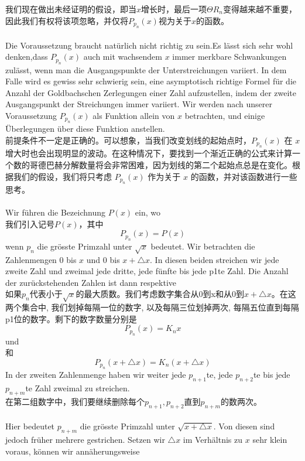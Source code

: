 \documentclass[UTF8,a4paper,zihao=-4]{article}
\begin{document}
\indent 我们现在做出未经证明的假设，即当$x$增长时，最后一项$\Theta R_n$变得越来越不重要，因此我们有权将该项忽略，并仅将$P_{p_n}(x)$视为关于$x$的函数。\\\\
\indent Die Voraussetzung braucht natürlich nicht richtig zu sein.Es lässt sich sehr wohl denken,dass $P_{p_n}(x)$ auch mit wachsendem $x$ immer merkbare Schwankungen zulässt, wenn man die Ausgangspunkte der Unterstreichungen variiert. In dem Falle wird es gewiss sehr schwierig sein, eine asymptotisch richtige Formel für die Anzahl der Goldbachschen Zerlegungen einer Zahl aufzustellen, indem der zweite Ausgangspunkt der Streichungen immer variiert. Wir werden nach unserer Voraussetzung $P_{p_n}(x)$ als Funktion allein von $x$ betrachten, und einige Überlegungen über diese Funktion anstellen.\\
\indent 前提条件不一定是正确的。可以想象，当我们改变划线的起始点时，$P_{p_n}(x)$ 在 $x$ 增大时也会出现明显的波动。在这种情况下，要找到一个渐近正确的公式来计算一个数的哥德巴赫分解数量将会非常困难，因为划线的第二个起始点总是在变化。根据我们的假设，我们将只考虑 $P_{p_n}(x)$ 作为关于 $x$ 的函数，并对该函数进行一些思考。\\\\
\indent Wir führen die Bezeichnung $P(x)$ ein, wo\\
\indent 我们引入记号$P(x)$，其中
$$
P_{p_n}(x)=P(x)
$$
wenn $p_n$ die grösste Primzahl unter $\sqrt x$ bedeutet. Wir betrachten die Zahlenmengen $0$ bis $x$ und $0$ bis $x+\triangle x$. In diesen beiden streichen wir jede zweite Zahl und zweimal jede dritte, jede fünfte bis jede p1te Zahl. Die Anzahl der zurückstehenden Zahlen ist dann respektive\\
如果$p_n$代表小于$\sqrt x$的最大质数。我们考虑数字集合从0到x和从0到$x+\triangle x$。在这两个集合中, 我们划掉每隔一位的数字, 以及每隔三位划掉两次, 每隔五位直到每隔p1位的数字。剩下的数字数量分别是
$$
P_{p_n}(x)=K_nx
$$
und\\
和
$$
P_{p_n}(x+\triangle x)=K_n(x+\triangle x)
$$
\indent In der zweiten Zahlenmenge haben wir weiter jede $p_{n+1}$te, jede $p_{n+2}$te bis jede $p_{n+m}$te Zahl zweimal zu streichen.\\
\indent 在第二组数字中，我们要继续删除每个$p_{n+1},p_{n+2}$直到$p_{n+m}$的数两次。\\\\
\indent Hier bedeutet $p_{n+m}$ die grösste Primzahl unter $\sqrt{x+\triangle x}$. Von diesen sind jedoch früher mehrere gestrichen. Setzen wir $\triangle x$ im Verhältnis zu $x$ sehr klein voraus, können wir annäherungsweise\\
\end{document}
